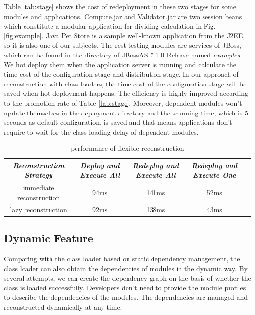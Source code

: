 \documentclass[conference]{IEEEtran}
\begin{document}
Table \ref{tab:stage} shows the cost of redeployment in these two stages for some modules and applications.
Compute.jar and Validator.jar are two session beans which constitute a modular application for dividing calculation in Fig. \ref{fig:example}.
Java Pet Store\cite{java_pet_store} is a sample well-known application from the J2EE\cite{j2ee}, so it is also one of our subjects.
The rest testing modules are services of JBoss, which can be found in the directory of JBossAS 5.1.0 Release named \emph{examples}.
We hot deploy them when the application server is running and calculate the time cost of the configuration stage and distribution stage.
In our approach of reconstruction with class loaders, the time cost of the configuration stage will be saved when hot deployment happens.
The efficiency is highly improved according to the promotion rate of Table \ref{tab:stage}.
Moreover, dependent modules won't update themselves in the deployment directory and the scanning time, which is 5 seconds as default configuration, is saved and that means applications don't require to wait for the class loading delay of dependent modules. 


\begin{table}
\centering
\caption{performance of flexible reconstruction}
\label{tab:flexibility}
\begin{tabular}{|c|c|c|c|c|}
\hline
\emph{Reconstruction Strategy}	& \emph{Deploy and Execute All}	& \emph{Redeploy and Execute All} & \emph{Redeploy and Execute One}\\
\hline
\hline
immediate reconstruction 	&	94ms				&	141ms				&	52ms\\
\hline
lazy reconstruction 	&	92ms				&	138ms				&	43ms\\
\hline
\end{tabular}
\end{table}


\subsection{Dynamic Feature}
Comparing with the class loader based on static dependency management, the class loader can also obtain the dependencies of modules in the dynamic way.
By several attempts, we can create the dependency graph on the basis of whether the class is loaded successfully.
Developers don't need to provide the module profiles to describe the dependencies of the modules.
The dependencies are managed and reconstructed dynamically at any time.
\end{document}
